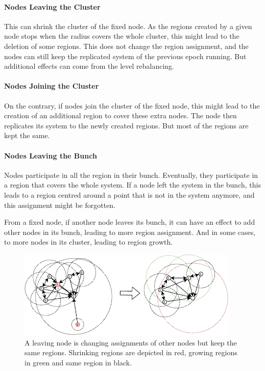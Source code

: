 \documentclass[a4paper,11pt,oneside]{report}
\begin{document}
\paragraph{Nodes Leaving the Cluster} This can shrink the cluster of the fixed
node. As the regions created by a given node stops when the radius covers the
whole cluster, this might lead to the deletion of some regions. This does not
change the region assignment, and the nodes can still keep the replicated system
of the previous epoch running. But additional effects can come from the level
rebalancing. 

\paragraph{Nodes Joining the Cluster} On the contrary, if nodes join the
cluster of the fixed node, this might lead to the creation of an additional
region to cover these extra nodes. The node then replicates its system to
the newly created regions. But most of the regions are kept the same.

\paragraph{Nodes Leaving the Bunch} Nodes participate in all the region in
their bunch. Eventually, they participate in a region that covers the
whole system. If a node left the system in the bunch, this leads to a region
centred around a point that is not in the system anymore, and this assignment might
be forgotten. 

From a fixed node, if another node leaves its bunch, it can have an effect to
add other nodes in its bunch, leading to more region assignment. And in some
cases, to more nodes in its cluster, leading to region growth. 

\begin{figure}[!h] \centering
  \includegraphics[width=300pt]{figures/LocarnoTreaties-Leaving-cluster}
  \caption{A leaving node is changing assignments of other nodes but keep the
  same regions. Shrinking regions are depicted in red, growing regions in
  green and same region in black. }
\label{fig:LocarnoTreaties-Leaving-cluster} \end{figure}
\end{document}
